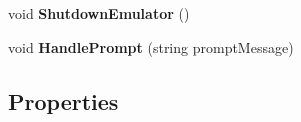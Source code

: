 \begin{DoxyCompactItemize}
\item 
\hypertarget{interface_snowflake_1_1_emulator_1_1_i_emulator_bridge_a5e7b55a9d318399191fd8857aa163f8c}{}void {\bfseries Shutdown\+Emulator} ()\label{interface_snowflake_1_1_emulator_1_1_i_emulator_bridge_a5e7b55a9d318399191fd8857aa163f8c}

\item 
\hypertarget{interface_snowflake_1_1_emulator_1_1_i_emulator_bridge_ac88a67e269c1d31551e8c4c0bd315c0e}{}void {\bfseries Handle\+Prompt} (string prompt\+Message)\label{interface_snowflake_1_1_emulator_1_1_i_emulator_bridge_ac88a67e269c1d31551e8c4c0bd315c0e}

\end{DoxyCompactItemize}
\subsection*{Properties}
